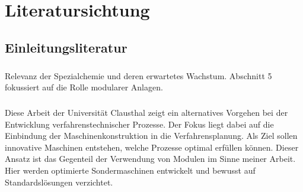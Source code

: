 \chapter{Literatursichtung}\label{ch:lit}
\section{Einleitungsliteratur}
\paragraph*{\cite{Wachsen_2015}} Relevanz der Spezialchemie und deren erwartetes Wachstum. Abschnitt 5 fokussiert auf die Rolle modularer Anlagen.

\paragraph*{\cite{Dietz_2000}} Diese Arbeit der Universit\"at Clausthal zeigt ein alternatives Vorgehen bei der Entwicklung verfahrenstechnischer Prozesse. Der Fokus liegt dabei auf die Einbindung der Maschinenkonstruktion in die Verfahrensplanung. Als Ziel sollen innovative Maschinen entstehen, welche Prozesse optimal erf\"ullen k\"onnen. Dieser Ansatz ist das Gegenteil der Verwendung von Modulen im Sinne meiner Arbeit. Hier werden optimierte Sondermaschinen entwickelt und bewusst auf Standardsl\"osungen verzichtet.\hfill \newline

